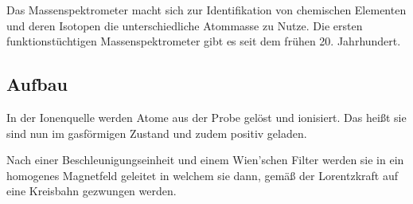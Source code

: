




%
%	





Das Massenspektrometer macht sich zur Identifikation von chemischen Elementen und deren Isotopen die unterschiedliche Atommasse zu Nutze. Die ersten funktionstüchtigen Massenspektrometer gibt es seit dem frühen 20. Jahrhundert.

\subsection{Aufbau}

In der Ionenquelle werden Atome aus der Probe gelöst und ionisiert. Das heißt sie sind nun im gasförmigen Zustand und zudem positiv geladen.

Nach einer Beschleunigungseinheit und einem Wien'schen Filter werden sie in ein homogenes Magnetfeld geleitet in welchem sie dann, gemäß der Lorentzkraft auf eine Kreisbahn gezwungen werden. 

